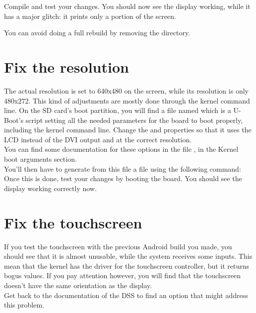 Compile and test your changes. You should now see the display working, while it
has a major glitch: it prints only a portion of the screen.

You can avoid doing a full rebuild by removing the
 directory.

\section{Fix the resolution}

The actual resolution is set to 640x480 on the screen, while its resolution is
only 480x272. This kind of adjustments are mostly done through the kernel
command line. On the SD card's boot partition, you will find a file named
 which is a U-Boot's script setting all the needed parameters for the
board to boot properly, including the kernel command line. Change the
 and  properties so that it uses the LCD instead of
the DVI output and at the correct resolution.\\

You can find some documentation for these options in the file
, in the Kernel boot arguments section.
\\

You'll then have to generate from this  file a  file
using the following command:
\\

Once this is done, test your changes by booting the board. You should see the
display working correctly now.

\section{Fix the touchscreen}

If you test the touchscreen with the previous Android build you made, you should
see that it is almost unusable, while the system receives some inputs. This mean
that the kernel has the driver for the touchscreen controller, but it returns
bogus values. If you pay attention however, you will find that the touchscreen
doesn't have the same orientation as the display.\\

Get back to the documentation of the DSS to find an option that might address
this problem.

